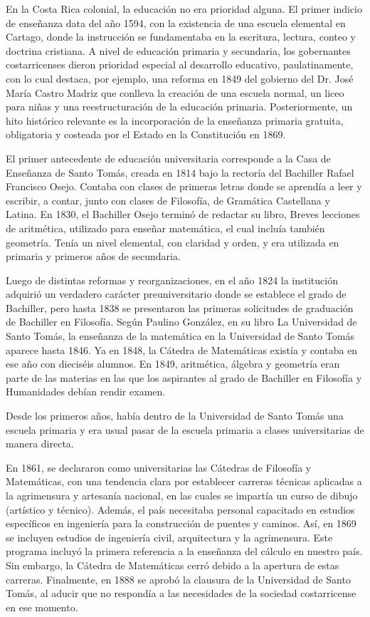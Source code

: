 En la Costa Rica colonial, la educación no era prioridad alguna. El primer indicio de enseñanza data del año 1594, con la existencia de una escuela elemental en Cartago, donde la instrucción se fundamentaba en la escritura, lectura, conteo y doctrina cristiana. A nivel de educación primaria y secundaria, los gobernantes costarricenses dieron prioridad especial al desarrollo educativo, paulatinamente, con lo cual destaca, por ejemplo, una reforma en 1849 del gobierno del Dr. José María Castro Madriz que conlleva la creación de una escuela normal, un liceo para niñas y una reestructuración de la educación primaria. Posteriormente, un hito histórico relevante es la incorporación de la enseñanza primaria gratuita, obligatoria y costeada por el Estado en la Constitución en 1869. 

El primer antecedente de educación universitaria corresponde a la Casa de Enseñanza de Santo Tomás, creada en 1814 bajo la rectoría del Bachiller Rafael Francisco Osejo. Contaba con clases de primeras letras donde se aprendía a leer y escribir, a contar, junto con clases de Filosofía, de Gramática Castellana y Latina. En 1830, el Bachiller Osejo terminó de redactar su libro, Breves lecciones de aritmética, utilizado para enseñar matemática, el cual incluía también geometría. Tenía un nivel elemental, con claridad y orden, y era utilizada en primaria y primeros años de secundaria.

Luego de distintas reformas y reorganizaciones, en el año 1824 la institución adquirió un verdadero carácter preuniversitario donde se establece el grado de Bachiller, pero hasta 1838 se presentaron las primeras solicitudes de graduación de Bachiller en Filosofía. Según Paulino González, en su libro La Universidad de Santo Tomás, la enseñanza de la matemática en la Universidad  de Santo Tomás aparece hasta 1846. Ya en 1848, la Cátedra de Matemáticas existía y contaba en ese año con dieciséis alumnos. En 1849, aritmética, álgebra y geometría eran parte de las materias en las que los aspirantes al grado de Bachiller en Filosofía y Humanidades debían rendir examen. 

Desde los primeros años, había dentro de la Universidad de Santo Tomás una escuela primaria y era usual pasar de la escuela primaria a clases universitarias de manera directa. 

En 1861, se declararon como universitarias las Cátedras de Filosofía y Matemáticas, con una tendencia clara por establecer carreras técnicas aplicadas a la agrimensura y artesanía nacional, en las cuales se impartía un curso de dibujo (artístico y técnico). Además, el país necesitaba personal capacitado en estudios específicos en ingeniería para la construcción de puentes y caminos. Así, en 1869 se incluyen estudios de ingeniería civil, arquitectura y la agrimensura. Este programa incluyó la primera referencia a la enseñanza del cálculo en nuestro país. Sin embargo, la Cátedra de Matemáticas cerró debido a la apertura de estas carreras. Finalmente, en 1888 se aprobó la clausura de la Universidad de Santo Tomás, al aducir que no respondía a las necesidades de la sociedad costarricense en ese momento. 

